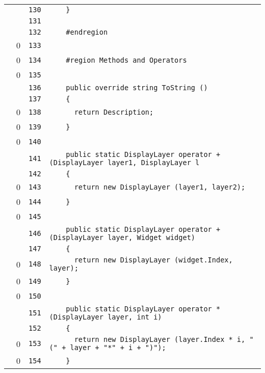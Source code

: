\documentclass[a4paper,10pt]{article}
\begin{document}
\begin{longtable}[l]{lrrl}
\cellcolor{gray} &  & \verb~130~ & \verb~    }~\\
\cellcolor{gray} &  & \verb~131~ & \verb~~\\
\cellcolor{gray} &  & \verb~132~ & \verb~    #endregion~\\
\cellcolor{red} & 0 & \verb~133~ & \verb~~\\
\cellcolor{red} & 0 & \verb~134~ & \verb~    #region Methods and Operators~\\
\cellcolor{red} & 0 & \verb~135~ & \verb~~\\
\cellcolor{gray} &  & \verb~136~ & \verb~    public override string ToString ()~\\
\cellcolor{gray} &  & \verb~137~ & \verb~    {~\\
\cellcolor{red} & 0 & \verb~138~ & \verb~      return Description;~\\
\cellcolor{red} & 0 & \verb~139~ & \verb~    }~\\
\cellcolor{red} & 0 & \verb~140~ & \verb~~\\
\cellcolor{gray} &  & \verb~141~ & \verb~    public static DisplayLayer operator + (DisplayLayer layer1, DisplayLayer l~\\
\cellcolor{gray} &  & \verb~142~ & \verb~    {~\\
\cellcolor{red} & 0 & \verb~143~ & \verb~      return new DisplayLayer (layer1, layer2);~\\
\cellcolor{red} & 0 & \verb~144~ & \verb~    }~\\
\cellcolor{red} & 0 & \verb~145~ & \verb~~\\
\cellcolor{gray} &  & \verb~146~ & \verb~    public static DisplayLayer operator + (DisplayLayer layer, Widget widget)~\\
\cellcolor{gray} &  & \verb~147~ & \verb~    {~\\
\cellcolor{red} & 0 & \verb~148~ & \verb~      return new DisplayLayer (widget.Index, layer);~\\
\cellcolor{red} & 0 & \verb~149~ & \verb~    }~\\
\cellcolor{red} & 0 & \verb~150~ & \verb~~\\
\cellcolor{gray} &  & \verb~151~ & \verb~    public static DisplayLayer operator * (DisplayLayer layer, int i)~\\
\cellcolor{gray} &  & \verb~152~ & \verb~    {~\\
\cellcolor{red} & 0 & \verb~153~ & \verb~      return new DisplayLayer (layer.Index * i, "(" + layer + "*" + i + ")");~\\
\cellcolor{red} & 0 & \verb~154~ & \verb~    }~\\

\end{longtable}
\end{document}
